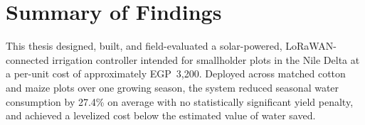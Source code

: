 \section{Summary of Findings}
This thesis designed, built, and field-evaluated a solar-powered, LoRaWAN-connected
irrigation controller intended for smallholder plots in the Nile Delta at a per-unit cost of
approximately EGP~3{,}200. Deployed across matched cotton and maize plots over one growing
season, the system reduced seasonal water consumption by 27.4\% on average with no
statistically significant yield penalty, and achieved a levelized cost below the estimated
value of water saved.
